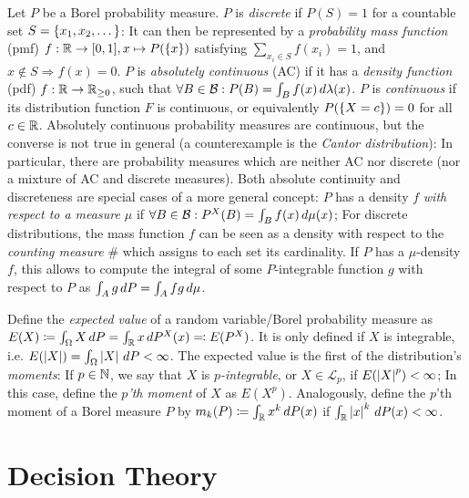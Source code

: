 \documentclass[a4paper]{scrreprt}
\newcommand{\Rp}{\mathbb{R}_{\geq 0}}
\newcommand{\B}{\mathcal{B}}
\begin{document}
    Let $P$ be a Borel probability measure.
    $P$ is \emph{discrete} if $P(S) = 1$ for a countable set $S = \{x_1, x_2, \dots\}$: It can then be represented by a \emph{probability mass function} (pmf) $f: \mathbb{R} \to [0, 1], x \mapsto P(\{x\})$ satisfying $\sum_{x_i \in S} f(x_i) = 1$, and $x \notin S \Rightarrow f(x) = 0$.
    $P$ is \emph{absolutely continuous} (AC) if it has a \emph{density function} (pdf) $f: \R \to \Rp$, such that $\forall B \in \B: P(B) = \lintegral{B}{f(x)}{\lambda(x)}$.
    $P$ is \emph{continuous} if its distribution function $F$ is continuous, or equivalently $P(\{X = c\}) = 0$ for all $c \in \mathbb{R}$.
    Absolutely continuous probability measures are continuous, but the converse is not true in general (a counterexample is the \emph{Cantor distribution}): In particular, there are probability measures which are neither AC nor discrete (nor a mixture of AC and discrete measures).
    Both absolute continuity and discreteness are special cases of a more general concept: $P$ has a density $f$ \emph{with respect to a measure $\mu$} if $\forall B \in \B: P^X(B) = \lintegral{B}{f(x)}{\mu(x)}$; For discrete distributions, the mass function $f$ can be seen as a density with respect to the \emph{counting measure} $\#$ which assigns to each set its cardinality.
    If $P$ has a $\mu$-density $f$, this allows to compute the integral of some $P$-integrable function $g$ with respect to $P$ as $\int_{A} g \, dP = \int_{A} f g \, d\mu$.
    
    Define the \emph{expected value} of a random variable/Borel probability measure as $E(X) \coloneqq \int_{\Omega} X \, dP = \int_{\mathbb{R}} x \, dP^X(x) \eqqcolon E(P^X)$. It is only defined if $X$ is integrable, i.e. $E(\left| X \right|) = \int_{\Omega} \left| X \right| \, dP < \infty$. 
    The expected value is the first of the distribution's \emph{moments}:
    If $p \in \mathbb{N}$, we say that $X$ is \emph{$p$-integrable}, or $X \in \mathcal{L}_p$, if $E(\left| X \right|^p) < \infty$;
    In this case, define the \emph{$p$'th moment} of $X$ as $E(X^p)$. Analogously, define the $p$'th moment of a Borel measure $P$ by $m_k(P) \coloneqq \int_{\mathbb{R}} x^k \, dP(x)$ if $\int_{\mathbb{R}} \left| x \right|^k \, dP(x) < \infty$.
    
    
    \section{Decision Theory}
    
\end{document}

